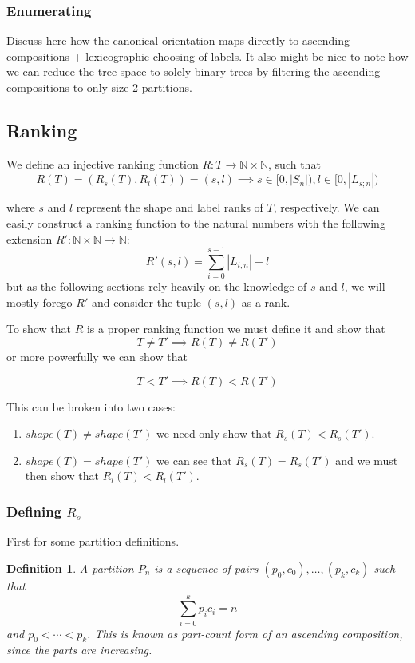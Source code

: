 \documentclass{article}
\newcommand{\halfopen}[2]{[#1, #2)}
\newcommand{\shape}[1]{shape(#1)}
\newtheorem{definition}{Definition}
\begin{document}

\subsubsection{Enumerating}
Discuss here how the canonical orientation maps directly to ascending compositions
+ lexicographic choosing of labels. It also might be nice to note how we can reduce
the tree space to solely binary trees by filtering the ascending compositions to
only size-2 partitions.

\subsection{Ranking}
We define an injective ranking function $R : T \rightarrow \mathbb{N} \times
\mathbb{N}$, such that
\[
    R(T) = (R_s(T), R_l(T)) = (s, l) \implies
    s \in \halfopen{0}{|S_n|}, l \in \halfopen{0}{|L_{s;n}|}
\]

where $s$ and $l$ represent the shape and label ranks of $T$, respectively.
We can easily construct a ranking function to the natural numbers
with the following extension
$R' : \mathbb{N} \times \mathbb{N} \rightarrow \mathbb{N}$:
\[
    R'(s, l) = \sum_{i=0}^{s - 1} |L_{i;n}| + l
\]
but as the following sections rely heavily on the knowledge of $s$ and $l$, we will
mostly forego $R'$ and consider the tuple $(s, l)$ as a rank.

To show that $R$ is a proper ranking function we must define it and show that
\[
    T \neq T' \implies R(T) \neq R(T')
\]
or more powerfully we can show that

\[
    T < T' \implies R(T) < R(T')
\]

This can be broken into two cases:
\begin{enumerate}
    \item $\shape{T} \neq \shape{T'}$ we need only show that $R_s(T) < R_s(T')$.
    \item $\shape{T} = \shape{T'}$ we can see that $R_s(T) = R_s(T')$ and we must
        then show that $R_l(T) < R_l(T')$.
\end{enumerate}

\subsubsection{Defining $R_s$}
First for some partition definitions.

\begin{definition}
    A partition $P_n$ is a sequence of pairs $(p_0, c_0), \ldots, (p_k, c_k)$ such
    that
    \[
        \sum_{i=0}^k p_i c_i = n
    \]
    and $p_0 < \cdots < p_k$. This is known as part-count form of an ascending
    composition, since the parts are increasing.
\end{definition}
\end{document}
